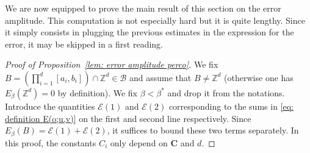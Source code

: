 \documentclass[11pt,a4paper]{article}
\numberwithin{equation}{section}
\theoremstyle{plain}
\theoremstyle{definition}
\newcommand\bfC{\mathbf{C}}
\newcommand{\connect}{\xleftrightarrow}
\begin{document}
We are now equipped to prove the main result of this section on the error amplitude. This computation is not especially hard but it is quite lengthy. Since it simply consists in plugging the previous estimates in the expression for the error, it may be skipped in a first reading.
\begin{proof}[Proof of Proposition~\textup{\ref{lem: error amplitude perco}}] %
 We fix $B=(\prod_{i=1}^d[a_i,b_i])\cap \mathbb Z^d\in \mathcal B$ and assume that $ B\neq \mathbb Z^d$ (otherwise one has $E_\beta(\mathbb Z^d)=0$ by definition).
% 
%
We fix $\beta<\beta^*$ and drop it from the notations. Introduce the quantities $\mathcal E(1)$ and $\mathcal E(2)$ corresponding to the sums in  \eqref{eq: definition E(o;u,v)} on the first and second line respectively. Since $	E_\beta(B)=\mathcal E(1)+\mathcal E(2)$, it suffices to bound these two terms separately. In this proof, the constants $C_i$ only depend on $\bfC$ and $d$.

\end{proof}
\end{document}
